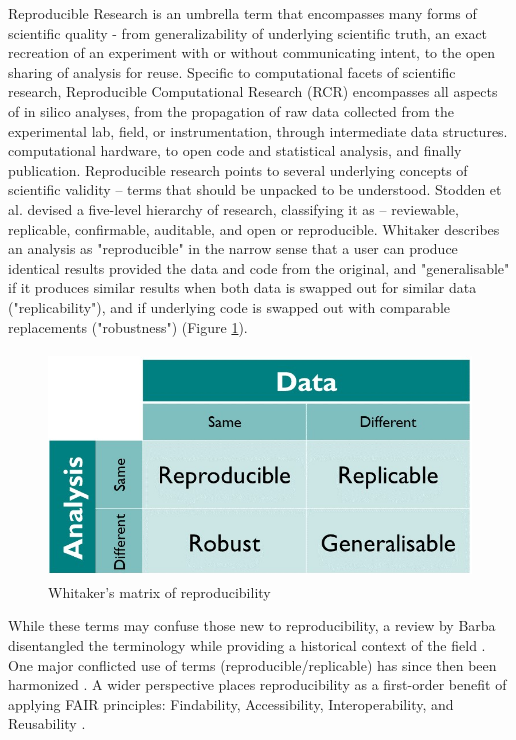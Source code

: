 \documentclass{drexelthesis}
\begin{document}
Reproducible Research is an umbrella term that encompasses many forms of scientific quality - from generalizability of underlying scientific truth, an exact recreation of an experiment with or without communicating intent, to the open sharing of analysis for reuse. Specific to computational facets of scientific research, Reproducible Computational Research (RCR)\cite{Donoho2010-xp} encompasses all aspects of in silico analyses, from the propagation of raw data collected from the experimental lab, field, or instrumentation, through intermediate data structures. computational hardware, to open code and statistical analysis, and finally publication. Reproducible research points to several underlying concepts of scientific validity – terms that should be unpacked to be understood. Stodden et al. \cite{Stodden2013-ce} devised a five-level hierarchy of research, classifying it as – reviewable, replicable, confirmable, auditable, and open or reproducible. Whitaker \cite{Whitaker2016-gl} describes an analysis as "reproducible" in the narrow sense that a user can produce identical results provided the data and code from the original, and "generalisable" if it produces similar results when both data is swapped out for similar data ("replicability"), and if underlying code is swapped out with comparable replacements ("robustness") (Figure \ref{whitaker}). 

\begin{figure}[h!]
	\centering
	\includegraphics[width=11.65cm,height=6.01cm]{./images/whitaker.png}
	\caption{Whitaker's matrix of reproducibility \cite{The_Turing_Way_Community2019-fn}}
	\label{whitaker}
\end{figure}

While these terms may confuse those new to reproducibility, a review by Barba disentangled the terminology while providing a historical context of the field \cite{Barba2018-qv}. One major conflicted use of terms (reproducible/replicable) has since then been harmonized \cite{noauthor_undated-or}.  A wider perspective places reproducibility as a first-order benefit of applying FAIR principles: Findability, Accessibility, Interoperability, and Reusability \cite{Wilkinson2016-qr}.
\end{document}
